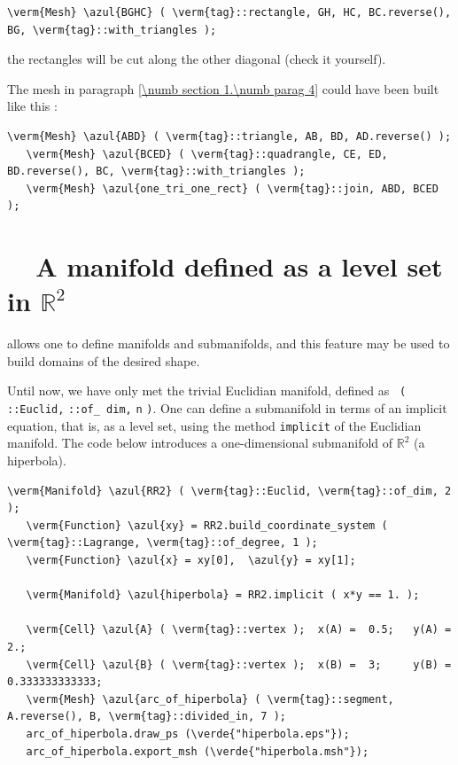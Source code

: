 \begin{Verbatim}[commandchars=\\\{\},formatcom=\small\tt,baselinestretch=0.94]
   \verm{Mesh} \azul{BGHC} ( \verm{tag}::rectangle, GH, HC, BC.reverse(), BG, \verm{tag}::with_triangles );
\end{Verbatim}

\noindent the rectangles will be cut along the other diagonal (check it yourself).

The mesh in paragraph \ref{\numb section 1.\numb parag 4} could have been built like this :

\begin{Verbatim}[commandchars=\\\{\},formatcom=\small\tt,baselinestretch=0.94]
   \verm{Mesh} \azul{ABD} ( \verm{tag}::triangle, AB, BD, AD.reverse() );
   \verm{Mesh} \azul{BCED} ( \verm{tag}::quadrangle, CE, ED, BD.reverse(), BC, \verm{tag}::with_triangles );
   \verm{Mesh} \azul{one_tri_one_rect} ( \verm{tag}::join, ABD, BCED );
\end{Verbatim}


\section{~~A manifold defined as a level set in $ \mathbb{R}^2 $}
\label{\numb section 2.\numb parag 3}

{\ManiFEM} allows one to define manifolds and submanifolds, and this feature may be
used to build domains of the desired shape.

Until now, we have only met the trivial Euclidian manifold, defined as {\small\tt
{}\break ( ::Euclid,} {\small\tt {}::of\_\,dim,} {\small\tt n}
{\small\tt )}.
One can define a submanifold in terms of an implicit equation, that is, as a level set,
using the method {\small\tt implicit} of the Euclidian manifold.
The code below introduces a one-dimensional submanifold of $ \mathbb{R}^2 $ (a hiperbola).

\begin{Verbatim}[commandchars=\\\{\},formatcom=\small\tt,frame=single,
   label=parag-\ref{\numb section 2.\numb parag 3}.cpp,rulecolor=\color{coment},
   baselinestretch=0.94,framesep=2mm]
   \verm{Manifold} \azul{RR2} ( \verm{tag}::Euclid, \verm{tag}::of_dim, 2 );
   \verm{Function} \azul{xy} = RR2.build_coordinate_system ( \verm{tag}::Lagrange, \verm{tag}::of_degree, 1 );
   \verm{Function} \azul{x} = xy[0],  \azul{y} = xy[1];
   
   \verm{Manifold} \azul{hiperbola} = RR2.implicit ( x*y == 1. );
   
   \verm{Cell} \azul{A} ( \verm{tag}::vertex );  x(A) =  0.5;   y(A) =  2.;
   \verm{Cell} \azul{B} ( \verm{tag}::vertex );  x(B) =  3;     y(B) =  0.333333333333;
   \verm{Mesh} \azul{arc_of_hiperbola} ( \verm{tag}::segment, A.reverse(), B, \verm{tag}::divided_in, 7 );
   arc_of_hiperbola.draw_ps (\verde{"hiperbola.eps"});
   arc_of_hiperbola.export_msh (\verde{"hiperbola.msh"});
\end{Verbatim}

